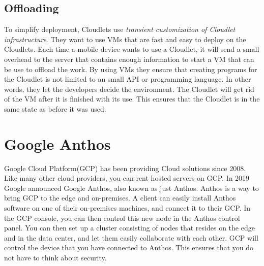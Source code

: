 \subsection{Offloading}
To simplify deployment, Cloudlets use \textit{transient customization of Cloudlet infrastructure}. They want to use VMs that are fast and easy to deploy on the Cloudlets. Each time a mobile device wants to use a Cloudlet, it will send a small overhead to the server that contains enough information to start a VM that can be use to offload the work. By using VMs they ensure that creating programs for the Cloudlet is not limited to an small API or programming language. In other words, they let the developers decide the environment. The Cloudlet will get rid of the VM after it is finished with its use. This ensures that the Cloudlet is in the same state as before it was used.






\section{Google Anthos}
Google Cloud Platform(GCP) has been providing Cloud solutions since 2008. Like many other cloud providers, you can rent hosted servers on GCP. In 2019 Google announced Google Anthos, also known as just Anthos. Anthos is a way to bring GCP to the edge and on-premises\cite{noauthor_anthos_nodate}. A client can easily install Anthos software on one of their on-premises machines, and connect it to their GCP. In the GCP console, you can then control this new node in the Anthos control panel. You can then set up a cluster consisting of nodes that resides on the edge and in the data center, and let them easily collaborate with each other. GCP will control the device that you have connected to Anthos. This ensures that you do not have to think about security.

